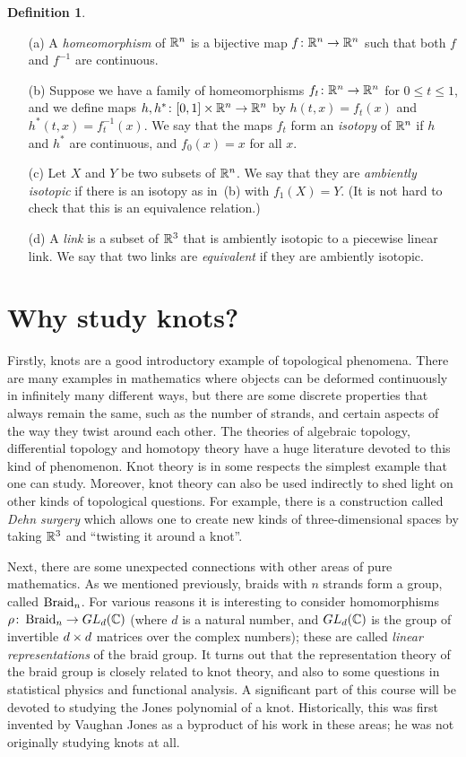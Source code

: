 \documentclass[reqno]{amsart}
\theoremstyle{definition}
\newtheorem{definition}[theorem]{Definition}
\begin{document}
\begin{definition}
 \begin{itemize}
  \item[(a)] A \emph{homeomorphism} of $\mathbb{R}^n$ is a bijective map
   $f\colon\mathbb{R}^n\to\mathbb{R}^n$ such that both $f$ and $f^{-1}$ are continuous.
  \item[(b)] Suppose we have a family of homeomorphisms
   $f_t\colon\mathbb{R}^n\to\mathbb{R}^n$ for $0\leq t\leq 1$, and we define maps
   $h,h^*\colon[0,1]\times\mathbb{R}^n\to\mathbb{R}^n$ by $h(t,x)=f_t(x)$ and
   $h^*(t,x)=f_t^{-1}(x)$.  We say that the maps $f_t$ form an
   \emph{isotopy} of $\mathbb{R}^n$ if $h$ and $h^*$ are continuous, and
   $f_0(x)=x$ for all $x$.
  \item[(c)] Let $X$ and $Y$ be two subsets of $\mathbb{R}^n$.  We say that
   they are \emph{ambiently isotopic} if there is an isotopy as in~(b)
   with $f_1(X)=Y$.  (It is not hard to check that this is an
   equivalence relation.)
  \item[(d)] A \emph{link} is a subset of $\mathbb{R}^3$ that is ambiently
   isotopic to a piecewise linear link.  We say that two links are
   \emph{equivalent} if they are ambiently isotopic.
 \end{itemize}
\end{definition}

\section{Why study knots?}
\label{sec-why-knots}

Firstly, knots are a good introductory example of topological
phenomena.  There are many examples in mathematics where objects can
be deformed continuously in infinitely many different ways, but there
are some discrete properties that always remain the same, such as the
number of strands, and certain aspects of the way they twist around
each other.  The theories of algebraic topology, differential topology
and homotopy theory have a huge literature devoted to this kind of
phenomenon.  Knot theory is in some respects the simplest example that
one can study.  Moreover, knot theory can also be used indirectly to
shed light on other kinds of topological questions.  For example,
there is a construction called \emph{Dehn surgery} which allows one to
create new kinds of three-dimensional spaces by taking $\mathbb{R}^3$ and
``twisting it around a knot''.  

Next, there are some unexpected connections with other areas of pure
mathematics.  As we mentioned previously, braids with $n$ strands form
a group, called $\operatorname{Braid}_n$.  For various reasons it is interesting to
consider homomorphisms $\rho\colon\operatorname{Braid}_n\to GL_d(\mathbb{C})$ (where $d$ is a
natural number, and $GL_d(\mathbb{C})$ is the group of invertible $d\times d$
matrices over the complex numbers); these are called \emph{linear
 representations} of the braid group.  It turns out that the
representation theory of the braid group is closely related to knot
theory, and also to some questions in statistical physics and
functional analysis.  A significant part of this course will be
devoted to studying the Jones polynomial of a knot.  Historically,
this was first invented by Vaughan Jones as a byproduct of his work in
these areas; he was not originally studying knots at all.
\end{document}
